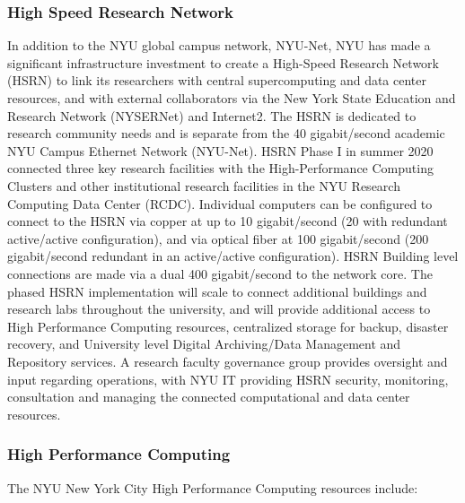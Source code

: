 \subsubsection*{High Speed Research Network}

In addition to the NYU global campus network, NYU-Net, NYU has made a significant infrastructure investment to create a High-Speed Research Network (HSRN) to link its researchers with central supercomputing and data center resources, and with external collaborators via the New York State Education and Research Network (NYSERNet) and Internet2. The HSRN is dedicated to research community needs and is separate from the 40 gigabit/second academic NYU Campus Ethernet Network (NYU-Net). HSRN Phase I in summer 2020 connected three key research facilities with the High-Performance Computing Clusters and other institutional research facilities in the NYU Research Computing Data Center (RCDC). Individual computers can be configured to connect to the HSRN via copper at up to 10 gigabit/second (20 with redundant active/active configuration), and via optical fiber at 100 gigabit/second (200 gigabit/second redundant in an active/active configuration). HSRN Building level connections are made via a dual 400 gigabit/second to the network core. The phased HSRN implementation will scale to connect additional buildings and research labs throughout the university, and will provide additional access to High Performance Computing resources, centralized storage for backup, disaster recovery, and University level Digital Archiving/Data Management and Repository services. A research faculty governance group provides oversight and input regarding operations, with NYU IT providing HSRN security, monitoring, consultation and managing the connected computational and data center resources.


\subsubsection*{High Performance Computing }
The NYU New York City High Performance Computing resources include:

